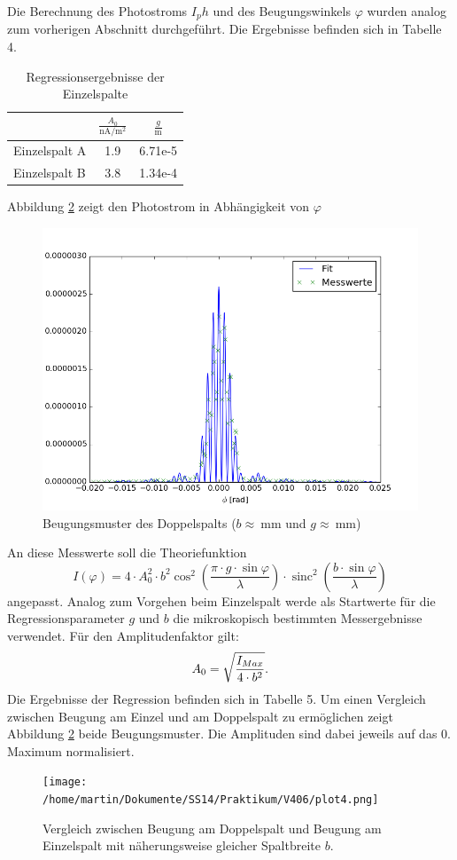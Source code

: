 \documentclass[11pt,ngerman,a4paper]{article}
\begin{document}
Die Berechnung des Photostroms $I_ph$ und des Beugungswinkels $\varphi$ wurden analog zum vorherigen Abschnitt durchgeführt. Die Ergebnisse befinden sich in Tabelle 4.
\begin{table}[h]
\centering
\begin{tabular}{lSS}

\toprule
&$\frac{A_0}{\si{\nano\ampere\per\meter\squared}}$ &$\frac{g}{\si{\meter}}$\\
\midrule
Einzelspalt A & 1.9  &6.71e-5 \\
Einzelspalt B & 3.8  &1.34e-4 \\
\bottomrule
\end{tabular}
\caption{Regressionsergebnisse der Einzelspalte}
\end{table}
 Abbildung \ref{plot3} zeigt den Photostrom in Abhängigkeit von $\varphi$ 
\begin{figure}[h]
\centering
\includegraphics[scale=0.8]{plot2.png}
\caption{Beugungsmuster des Doppelspalts ($b \approx \SI{}{\milli\meter}$ und $g\approx \SI{}{\milli\meter} $)}
\label{plot0}
\end{figure} 
An diese Messwerte soll die Theoriefunktion
\begin{equation}
I(\varphi) = 4 \cdot A_0^2\cdot b^2\cos^2\left(\frac{\pi\cdot g \cdot \sin \varphi}{\lambda}\right)\cdot \operatorname{sinc}^2\left( \frac{b\cdot\sin{\varphi}}{\lambda}\right) 
\end{equation}
angepasst. Analog zum Vorgehen beim Einzelspalt werde als Startwerte für die Regressionsparameter $g$ und $b$ die mikroskopisch bestimmten Messergebnisse verwendet. Für den Amplitudenfaktor gilt:
\[
A_0 = \sqrt{\frac{I_{Max}}{4\cdot b^2}}\rm.
\]
Die Ergebnisse der Regression befinden sich in Tabelle 5. Um einen Vergleich zwischen Beugung am Einzel und am Doppelspalt zu ermöglichen zeigt Abbildung \ref{plot3} beide Beugungsmuster. Die Amplituden sind dabei jeweils auf das 0. Maximum normalisiert. 
\begin{figure}[htp]
\centering
\texttt{[image: /home/martin/Dokumente/SS14/Praktikum/V406/plot4.png]}
\caption{Vergleich zwischen Beugung am Doppelspalt und Beugung am Einzelspalt mit näherungsweise gleicher Spaltbreite $b$.}
\label{plot3}
\end{figure}
\end{document}
